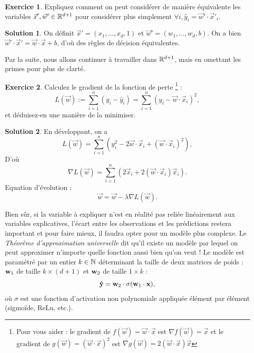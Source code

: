 \documentclass[a4paper,francais]{article}
\newcommand{\N}{{\ensuremath\mathbb{N}}}
\newcommand{\R}{{\ensuremath\mathbb{R}}}
\theoremstyle{definition}
\newtheorem{exercice}{Exercice}[section]
\newtheorem*{solution}{Solution}
\begin{document}
\begin{exercice}
  Expliquez comment on peut considérer de manière équivalente
  les variables $\vec{x}', \vec{w}' \in \R^{d+1}$ pour considérer
  plus simplement $\forall i, \hat{y}_i = \vec{w}' \cdot \vec{x}'_i.$
\end{exercice}

\begin{solution}
  On définit $\vec{x}' = (x_1, \dots, x_d, 1)$ et
  $\vec{w}' = (w_1, \dots, w_d, b)$. On a bien
  $\vec{w}'\cdot\vec{x}' = \vec{w}\cdot\vec{x} + b$,
  d'où des règles de décision équivalentes. 
\end{solution}

Par la suite, nous allons continuer à travailler dans $\R^{d+1}$,
mais en omettant les primes pour plus de clarté. 

\begin{exercice}
  Calculez le gradient de la fonction de perte
  \footnote{Pour vous aider :
  le gradient de $f(\vec{w}) = \vec{w}\cdot\vec{x}$ est $\nabla f(\vec{w}) = \vec{x}$
  et le gradient de $g(\vec{w}) = (\vec{w}\cdot\vec{x})^2$ est
  $\nabla g(\vec{w}) = 2(\vec{w}\cdot\vec{x})\vec{x}$} :
  \[ L(\vec{w}) := \sum_{i=1}^{n} (y_i - \hat{y}_i)
  = \sum_{i=1}^{n} (y_i - \vec{w}\cdot\vec{x}_i)^2, \]
  et déduisez-en une manière de la minimiser. 
\end{exercice}

\begin{solution}
  En développant, on a
  \[ L(\vec{w}) = \sum_{i=1}^{n} ( y_i^2 - 2\vec{w} \cdot \vec{x}_i + (\vec{w} \cdot \vec{x}_i)^2 ), \]
  D'où
  \[ \nabla L(\vec{w}) = \sum_{i=1}^{n} ( 2\vec{x}_i + 2(\vec{w} \cdot \vec{x}_i)\vec{x}_i ). \]
  Equation d'évolution :
  \[ \vec{w} = \vec{w} - \lambda \nabla L(\vec{w}). \]
\end{solution}

Bien sûr, si la variable à expliquer n'est en réalité pas reliée
linéairement aux variables explicatives, l'écart entre les observations
et les prédictions restera important et pour faire mieux, il
faudra opter pour un modèle plus complexe. Le \emph{Théorème
d'approximation universelle} dit qu'il existe un modèle par lequel
on peut approximer n'importe quelle fonction aussi bien qu'on veut !
Le modèle est paramétré par un entier $k \in \N$ déterminant la taille
de deux matrices de poids : $\mathbf{w}_1$ de taille $k \times (d+1)$ et
$\mathbf{w}_2$ de taille $1 \times k$ :
\[ \mathbf{\hat{y}} = \mathbf{w}_2 \cdot \sigma ( \mathbf{w}_1 \cdot \mathbf{x} ), \]
où $\sigma$ est une fonction d'activation non polynomiale appliquée
élément par élément (sigmoïde, ReLu, etc.). 
\end{document}
